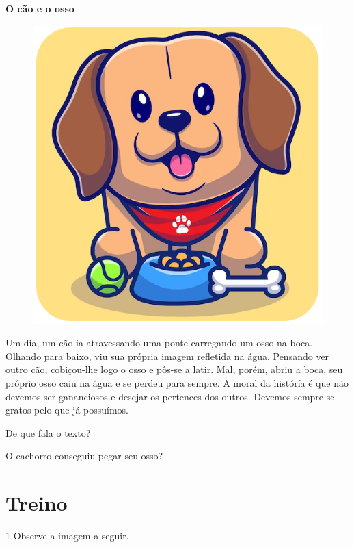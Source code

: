 \begin{myquote}
\textbf{O cão e o osso}

\begin{figure}[H]
\centering
\includegraphics[width=.65\textwidth]{media/image193.png}
\end{figure}

Um dia, um cão ia atravessando uma ponte carregando um osso na boca.
Olhando para baixo, viu sua própria imagem refletida
na água. Pensando ver outro cão, cobiçou-lhe logo o osso e
pôs-se a latir. Mal, porém, abriu a boca, seu próprio osso caiu
na água e se perdeu para sempre.
A moral da históría é que não devemos ser gananciosos e desejar os pertences dos outros. Devemos sempre se gratos pelo que já possuímos. 

\end{myquote}

\begin{escolha}
\item De que fala o texto?\\

\item O cachorro conseguiu pegar seu osso?\\
\end{escolha}

\section*{Treino}

\num{1} Observe a imagem a seguir.

